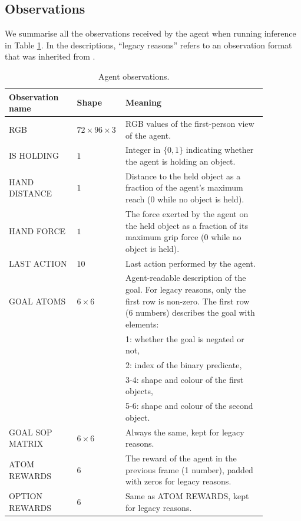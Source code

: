 \subsection{Observations}
\label{app:observations}

We summarise all the observations received by the agent when running inference in Table \ref{tab:observations}. In the descriptions, ``legacy reasons'' refers to an observation format that was inherited from \citet{xland}.

\begin{longtable}{>{\raggedright}p{0.25\linewidth}|p{0.1\linewidth}|p{0.52\linewidth}}
    \caption{Agent observations.}
    \label{tab:observations}
    \\ \hline
      \textbf{Observation name} & \textbf{Shape} & \textbf{Meaning} \\
      \hline
      RGB & $72 \times 96 \times 3$ & RGB values of the first-person view of the agent. \\
      \hline
      IS HOLDING & $1$& Integer in $\{0, 1\}$ indicating whether the agent is holding an object.\\
      \hline
      HAND DISTANCE & $1$& Distance to the held object as a fraction of the agent's maximum reach (0 while no object is held).\\
      \hline
      HAND FORCE & $1$ & The force exerted by the agent on the held object as a fraction of its maximum grip force (0 while no object is held).\\
      \hline
      LAST ACTION & $10$ & Last action performed by the agent.\\
      \hline
      GOAL ATOMS & $6 \times 6$ & Agent-readable description of the goal. For legacy reasons, only the first row is non-zero. The first row (6 numbers) describes the goal with elements:\\&&1: whether the goal is negated or not,\\&& 2: index of the binary predicate,\\&&3-4: shape and colour of the first objects,\\&&5-6: shape and colour of the second object. \\
      \hline
      GOAL SOP MATRIX & $6 \times 6$ & Always the same, kept for legacy reasons.\\
      \hline
      ATOM REWARDS & $6$ & The reward of the agent in the previous frame (1 number), padded with zeros for legacy reasons.\\
      \hline
      OPTION REWARDS & $6$ & Same as ATOM REWARDS, kept for legacy reasons.\\

\end{longtable}
